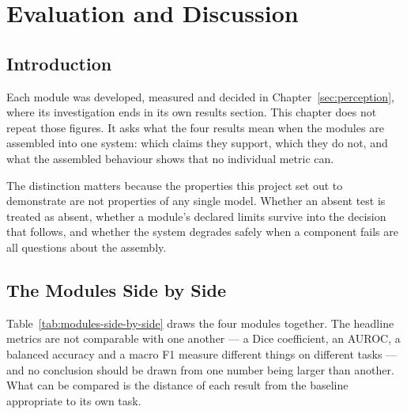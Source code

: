%
\section{Evaluation and Discussion}
\label{sec:results}

\subsection{Introduction}

Each module was developed, measured and decided in Chapter~\ref{sec:perception}, where its
investigation ends in its own results section. This chapter does not repeat those figures. It
asks what the four results mean when the modules are assembled into one system: which claims
they support, which they do not, and what the assembled behaviour shows that no individual
metric can.

The distinction matters because the properties this project set out to demonstrate are not
properties of any single model. Whether an absent test is treated as absent, whether a
module's declared limits survive into the decision that follows, and whether the system
degrades safely when a component fails are all questions about the assembly.

\subsection{The Modules Side by Side}
\label{subsec:results-comparison}

Table~\ref{tab:modules-side-by-side} draws the four modules together. The headline metrics are
not comparable with one another --- a Dice coefficient, an AUROC, a balanced accuracy and a
macro F1 measure different things on different tasks --- and no conclusion should be drawn from
one number being larger than another. What can be compared is the distance of each result from
the baseline appropriate to its own task.

